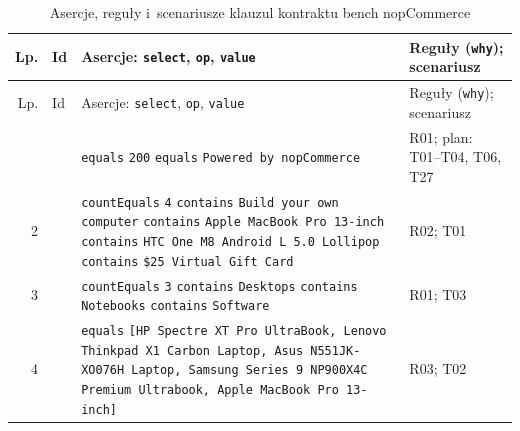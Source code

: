 {\footnotesize
\begin{xltabular}{\linewidth}{@{}r >{\raggedright\arraybackslash}p{3.0cm} >{\raggedright\arraybackslash}X >{\raggedright\arraybackslash}p{2.4cm}@{}}
\caption{Asercje, reguły i~scenariusze klauzul kontraktu bench nopCommerce}\label{tab:klauzule-asercje}\\
\toprule
Lp. & Id & Asercje: \texttt{select}, \texttt{op}, \texttt{value} & Reguły (\texttt{why}); scenariusz \\
\midrule
\endfirsthead
\toprule
Lp. & Id & Asercje: \texttt{select}, \texttt{op}, \texttt{value} & Reguły (\texttt{why}); scenariusz \\
\midrule
\endhead
\bottomrule
{} &  &  \texttt{equals} \texttt{200} \newline {} \texttt{equals} \texttt{\textquotedbl{}Powered by nopCommerce\textquotedbl{}} & R01; plan: T01--T04, T06, T27 \\
2 &  &  \texttt{countEquals} \texttt{4} \newline {} \texttt{contains} \texttt{\textquotedbl{}Build your own computer\textquotedbl{}} \newline {} \texttt{contains} \texttt{\textquotedbl{}Apple MacBook Pro 13-inch\textquotedbl{}} \newline {} \texttt{contains} \texttt{\textquotedbl{}HTC One M8 Android L 5.0 Lollipop\textquotedbl{}} \newline {} \texttt{contains} \texttt{\textquotedbl{}\$25 Virtual Gift Card\textquotedbl{}} & R02; T01 \\
3 &  &  \texttt{countEquals} \texttt{3} \newline {} \texttt{contains} \texttt{\textquotedbl{}Desktops\textquotedbl{}} \newline {} \texttt{contains} \texttt{\textquotedbl{}Notebooks\textquotedbl{}} \newline {} \texttt{contains} \texttt{\textquotedbl{}Software\textquotedbl{}} & R01; T03 \\
4 &  &  \texttt{equals} \texttt{[\textquotedbl{}HP Spectre XT Pro UltraBook\textquotedbl{}, \textquotedbl{}Lenovo Thinkpad X1 Carbon Laptop\textquotedbl{}, \textquotedbl{}Asus N551JK-XO076H Laptop\textquotedbl{}, \textquotedbl{}Samsung Series 9 NP900X4C Premium Ultrabook\textquotedbl{}, \textquotedbl{}Apple MacBook Pro 13-inch\textquotedbl{}]} & R03; T02 \\

\end{xltabular}}

